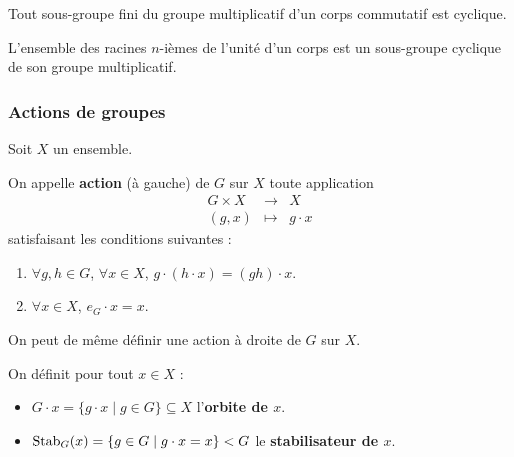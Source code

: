 
  \begin{theorem}
    Tout sous-groupe fini du groupe multiplicatif d'un corps commutatif est cyclique.
  \end{theorem}

  \begin{corollary}
    L'ensemble des racines $n$-ièmes de l'unité d'un corps est un sous-groupe cyclique de son groupe multiplicatif.
  \end{corollary}

  \subsubsection{Actions de groupes}


  Soit $X$ un ensemble.

  \begin{definition}
    On appelle \textbf{action} (à gauche) de $G$ sur $X$ toute application
    \[
    \begin{array}{ccc}
      G \times X &\rightarrow& X \\
      (g, x) &\mapsto& g \cdot x
    \end{array}
    \]
    satisfaisant les conditions suivantes :
    \begin{enumerate}[label=(\roman*)]
      \item $\forall g, h \in G$, $\forall x \in X$, $g \cdot (h \cdot x) = (gh) \cdot x$.
      \item $\forall x \in X$, $e_G \cdot x = x$.
    \end{enumerate}
  \end{definition}

  \begin{remark}
    On peut de même définir une action à droite de $G$ sur $X$.
  \end{remark}

  \begin{definition}
    On définit pour tout $x \in X$ :
    \begin{itemize}
      \item $G \cdot x = \{ g \cdot x \mid g \in G \} \subseteq X$ l'\textbf{orbite de $x$}.
      \item $\operatorname{Stab}_G(x) = \{ g \in G \mid g \cdot x = x \} < G$ le \textbf{stabilisateur de $x$}.
    \end{itemize}
  \end{definition}

